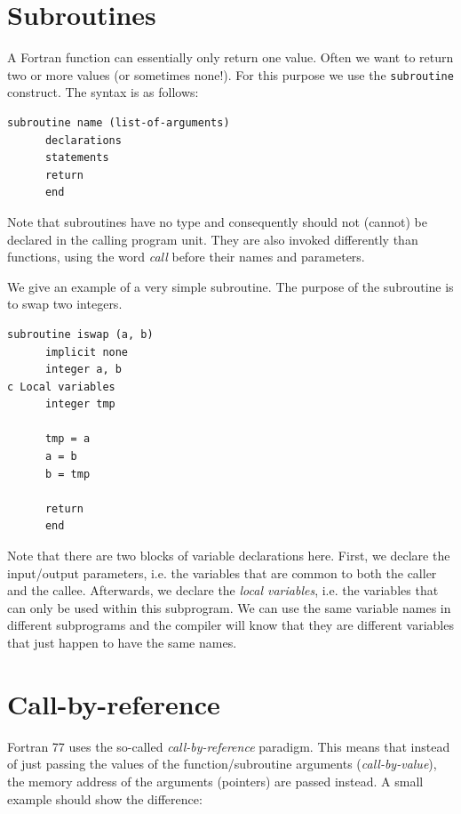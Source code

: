 \section{Subroutines}

A Fortran function can essentially only return one value. Often we want to return two or more values (or sometimes none!). For this purpose we use the \texttt{subroutine} construct. The syntax is as follows:

\begin{lstlisting}[style=fortran77]
      subroutine name (list-of-arguments)
      declarations
      statements
      return
      end
\end{lstlisting}

Note that subroutines have no type and consequently should not (cannot) be declared in the calling program unit. They are also invoked differently than functions, using the word \emph{call} before their names and parameters.

We give an example of a very simple subroutine. The purpose of the subroutine is to swap two integers.

\begin{lstlisting}[style=fortran77]
      subroutine iswap (a, b)
      implicit none
      integer a, b
c Local variables
      integer tmp

      tmp = a
      a = b
      b = tmp

      return
      end
\end{lstlisting}

Note that there are two blocks of variable declarations here. First, we declare the input/output parameters, i.e. the variables that are common to both the caller and the callee. Afterwards, we declare the \emph{local variables}, i.e. the variables that can only be used within this subprogram. We can use the same variable names in different subprograms and the compiler will know that they are different variables that just happen to have the same names.

\section{Call-by-reference}

Fortran 77 uses the so-called \emph{call-by-reference} paradigm. This means that instead of just passing the values of the function/subroutine arguments (\emph{call-by-value}), the memory address of the arguments (pointers) are passed instead. A small example should show the difference:

